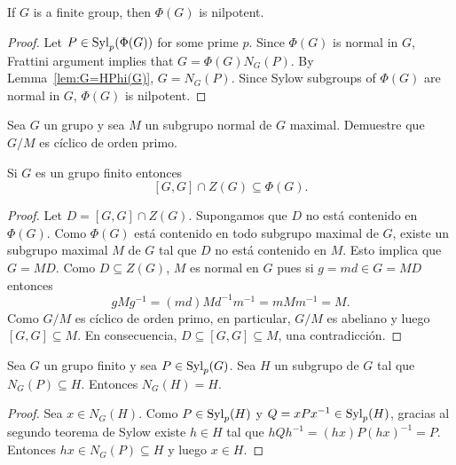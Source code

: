 \begin{theorem}[Frattini]
	\label{theorem:Frattini}
	If $G$ is a finite group, then $\Phi(G)$ is nilpotent. 
\end{theorem}

\begin{proof}
	Let $P\in\mathrm{Syl}_p(\Phi(G))$ for some prime $p$. Since $\Phi(G)$ is normal in
	$G$, Frattini argument implies that 
	$G=\Phi(G)N_G(P)$. By Lemma~\ref{lem:G=HPhi(G)},
	$G=N_G(P)$. Since Sylow subgroups of $\Phi(G)$ are normal in $G$,
	$\Phi(G)$ is nilpotent.
\end{proof}

\begin{exercise}
	\label{exercise:G/M}
	Sea $G$ un grupo y sea $M$ un subgrupo normal de $G$ maximal. Demuestre que
	$G/M$ es cíclico de orden primo. 
\end{exercise}


\begin{theorem}
	\label{thm:Gaschutz}
	Si $G$ es un grupo finito entonces 
	\[
	[G,G]\cap Z(G)\subseteq\Phi(G).
	\]
\end{theorem}

\begin{proof}
	Let $D=[G,G]\cap Z(G)$. Supongamos que $D$ no está contenido en $\Phi(G)$.
	Como $\Phi(G)$ está contenido en todo subgrupo maximal de $G$, existe un
	subgrupo maximal $M$ de $G$ tal que $D$ no está contenido en $M$.  Esto
	implica que $G=MD$. Como $D\subseteq Z(G)$, $M$ es normal en $G$ pues si
	$g=md\in G=MD$ entonces
	\[
		gMg^{-1}=(md)Md^{-1}m^{-1}=mMm^{-1}=M.
	\]
	Como $G/M$ es cíclico de orden
	primo, en particular, $G/M$ es abeliano y luego $[G,G]\subseteq M$. En consecuencia, 
	$D\subseteq [G,G]\subseteq M$, una contradicción.
\end{proof}

\begin{lemma}
	\label{lemma:N_G(H)=H}
	Sea $G$ un grupo finito y sea $P\in\mathrm{Syl}_p(G)$. Sea $H$ un subgrupo de $G$
	tal que $N_G(P)\subseteq H$. Entonces $N_G(H)=H$.
\end{lemma}

\begin{proof}
	Sea $x\in N_G(H)$. Como $P\in\mathrm{Syl}_p(H)$ y $Q=xPx^{-1}\in\mathrm{Syl}_p(H)$, gracias al segundo teorema de Sylow 
	existe
	$h\in H$ tal que $hQh^{-1}=(hx)P(hx)^{-1}=P$. Entonces $hx\in
	N_G(P)\subseteq H$ y luego $x\in H$. 
\end{proof}

